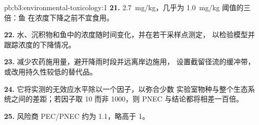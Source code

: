 \begin{solution}{pb:b3:environmental-toxicology:1}
\textbf{21.} \qty{2.7}{mg/kg}，几乎为 \qty{1.0}{mg/kg} 阈值的三倍：鱼
在浓度下降之前不宜食用。

\textbf{22.} 水、沉积物和鱼中的浓度随时间变化，并在若干采样点测定，
以检验模型并跟踪浓度的下降情况。

\textbf{23.} 减少农药施用量，避开降雨时段并远离岸边施用，
设置截留径流的缓冲带，或改用持久性较低的替代品。

\textbf{24.} 它将实测的无效应水平除以一个因子，以弥合少数
实验室物种与整个生态系统之间的差距；若因子取 10 而非 1000，则
PNEC 与结论都将相差一百倍。

\textbf{25.} 风险商 PEC/PNEC 约为 1.1，略高于 1。
\end{solution}
